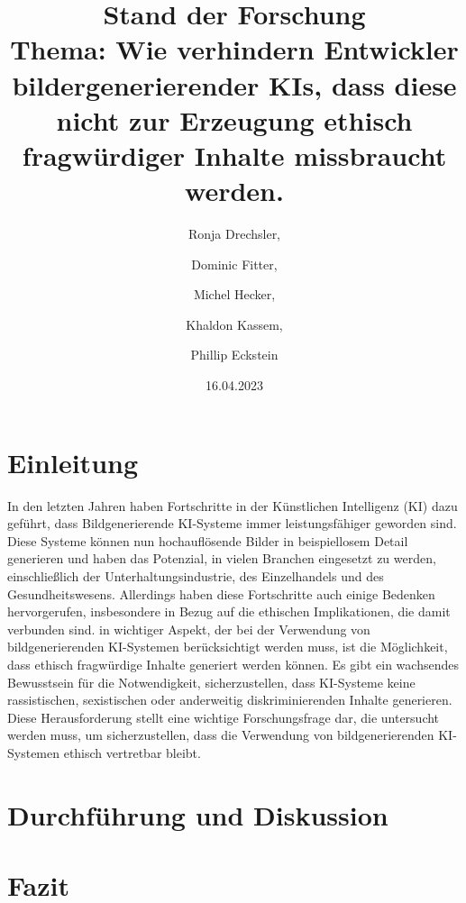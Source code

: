 \documentclass[12pt]{article}
\title{Stand der Forschung \\[1ex] \large Thema: Wie verhindern Entwickler bildergenerierender KIs, dass diese nicht zur Erzeugung ethisch fragwürdiger Inhalte missbraucht werden.}
\date{16.04.2023}
\author{Ronja Drechsler, \and Dominic Fitter, \and Michel Hecker, \and Khaldon Kassem, \and Phillip Eckstein}
\begin{document}
\maketitle
\tableofcontents
\section{Einleitung}
In den letzten Jahren haben Fortschritte in der Künstlichen Intelligenz (KI) dazu geführt, dass Bildgenerierende KI-Systeme immer 
leistungsfähiger geworden sind. Diese Systeme können nun hochauflösende Bilder in beispiellosem Detail generieren und haben das Potenzial,
 in vielen Branchen eingesetzt zu werden, einschließlich der Unterhaltungsindustrie, des Einzelhandels und des Gesundheitswesens. 
 Allerdings haben diese Fortschritte auch einige Bedenken hervorgerufen, insbesondere in Bezug auf die ethischen Implikationen, 
 die damit verbunden sind.
 in wichtiger Aspekt, der bei der Verwendung von bildgenerierenden KI-Systemen berücksichtigt werden muss, ist die Möglichkeit, dass ethisch fragwürdige Inhalte generiert werden können. Es gibt ein wachsendes Bewusstsein für die Notwendigkeit, sicherzustellen, dass KI-Systeme keine rassistischen, sexistischen oder anderweitig diskriminierenden Inhalte generieren. Diese Herausforderung stellt eine wichtige Forschungsfrage dar, die untersucht werden muss, um sicherzustellen, dass die Verwendung von bildgenerierenden KI-Systemen ethisch vertretbar bleibt.


\section{Durchführung und Diskussion}
\section{Fazit}
\end{document}
